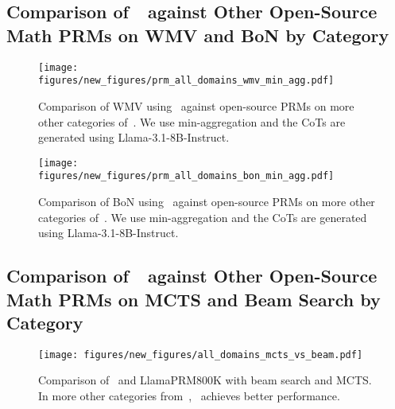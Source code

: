 \clearpage


\subsection{Comparison of~\ourprm~against Other Open-Source Math PRMs on WMV and BoN by Category}
\label{sec:bon-mv-bycat}


\begin{figure*}[ht]
    \begin{center}
        \texttt{[image: figures/new\_figures/prm\_all\_domains\_wmv\_min\_agg.pdf]}        
        \caption{Comparison of WMV using \ourprm~against open-source PRMs on more other categories of~\ourdataeval. We use min-aggregation and the CoTs are generated using Llama-3.1-8B-Instruct.}
        \label{fig:prm-wmv-more-domains}
    \end{center}
\end{figure*}


\begin{figure*}[ht]
    \begin{center}
        \texttt{[image: figures/new\_figures/prm\_all\_domains\_bon\_min\_agg.pdf]}        
        \caption{Comparison of BoN using \ourprm~against open-source PRMs on more other categories of~\ourdataeval. 
        We use min-aggregation and the CoTs are generated using Llama-3.1-8B-Instruct.}
        \label{fig:prm-bon-more-domains1}
    \end{center}
\end{figure*}


\clearpage

\subsection{Comparison of~\ourprm~against Other Open-Source Math PRMs on MCTS and Beam Search by Category}
\label{sec:mcts-detailed}


\begin{figure*}[ht]
    \begin{center}
        \texttt{[image: figures/new\_figures/all\_domains\_mcts\_vs\_beam.pdf]}        
        \caption{Comparison of \ourprm~and LlamaPRM800K
        with beam search and MCTS. In more other categories from~\ourdataeval, \ourprm~achieves better performance.}
        \label{fig:prm-wmv-more-domains2}
    \end{center}
\end{figure*}